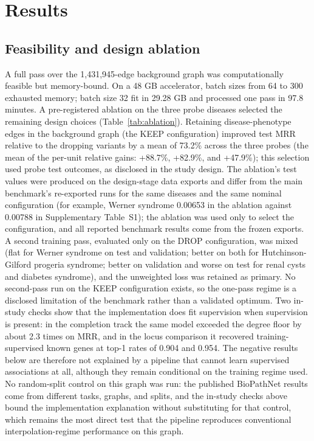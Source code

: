 \documentclass[11pt]{article}
\begin{document}
\section{Results}

\subsection{Feasibility and design ablation}
\label{sec:results-feasibility}

A full pass over the 1,431,945-edge background graph was computationally feasible but memory-bound. On a 48 GB accelerator, batch sizes from 64 to 300 exhausted memory; batch size 32 fit in 29.28 GB and processed one pass in 97.8 minutes. A pre-registered ablation on the three probe diseases selected the remaining design choices (Table~\ref{tab:ablation}). Retaining disease-phenotype edges in the background graph (the KEEP configuration) improved test MRR relative to the dropping variants by a mean of 73.2\% across the three probes (the mean of the per-unit relative gains: +88.7\%, +82.9\%, and +47.9\%); this selection used probe test outcomes, as disclosed in the study design. The ablation's test values were produced on the design-stage data exports and differ from the main benchmark's re-exported runs for the same diseases and the same nominal configuration (for example, Werner syndrome 0.00653 in the ablation against 0.00788 in Supplementary Table~S1); the ablation was used only to select the configuration, and all reported benchmark results come from the frozen exports. A second training pass, evaluated only on the DROP configuration, was mixed (flat for Werner syndrome on test and validation; better on both for Hutchinson-Gilford progeria syndrome; better on validation and worse on test for renal cysts and diabetes syndrome), and the unweighted loss was retained as primary. No second-pass run on the KEEP configuration exists, so the one-pass regime is a disclosed limitation of the benchmark rather than a validated optimum. Two in-study checks show that the implementation does fit supervision when supervision is present: in the completion track the same model exceeded the degree floor by about 2.3 times on MRR, and in the locus comparison it recovered training-supervised known genes at top-1 rates of 0.904 and 0.954. The negative results below are therefore not explained by a pipeline that cannot learn supervised associations at all, although they remain conditional on the training regime used. No random-split control on this graph was run: the published BioPathNet results come from different tasks, graphs, and splits, and the in-study checks above bound the implementation explanation without substituting for that control, which remains the most direct test that the pipeline reproduces conventional interpolation-regime performance on this graph.
\end{document}
